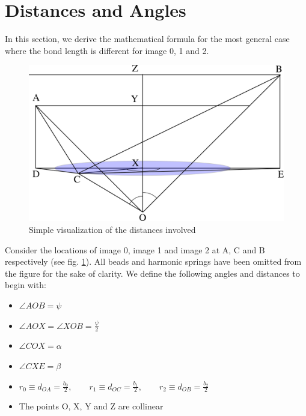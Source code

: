 \label{Appendix A}
    \section{Distances and Angles}
        In this section, we derive the mathematical formula for the most general case where the bond length is different for image 0, 1 and 2.
        \begin{figure}[!htbp]
            \centering
            \includegraphics[scale=1.5,keepaspectratio]{Appendix-A/Figures/differentBondlength.png}
            \caption{Simple visualization of the distances involved}
            \label{fig:dist}
        \end{figure}
        Consider the locations of image 0, image 1 and image 2 at A, C and B respectively (see fig. \ref{fig:dist}). All beads and harmonic springs have been omitted from the figure for the sake of clarity. We define the following angles and distances to begin with:
        \begin{itemize}
            \item $\angle AOB = \psi$
            \item $\angle AOX = \angle XOB = \displaystyle\frac{\psi}{2}$
            \item $\angle COX = \alpha$
            \item $\angle CXE = \beta$
            \item $r_0 \equiv d_{OA} = \displaystyle\frac{b_0}{2} , \qquad r_1 \equiv d_{OC} = \frac{b_1}{2}, \qquad r_2 \equiv d_{OB} = \frac{b_2}{2}$
            \item The points O, X, Y and Z are collinear
        \end{itemize}

